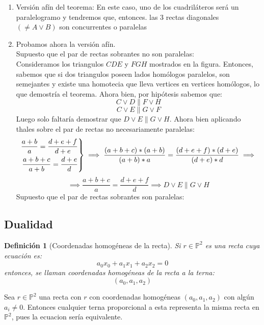 \documentclass[11pt, a4paper]{article}
\makeatletter
\newif\IfInSansMode
\let\oldsf\sffamily
\renewcommand*{\sffamily}{\oldsf\mathversion{sans}\InSansModetrue}
\let\oldnorm\normalfont
\renewcommand*{\normalfont}{\oldnorm\InSansModefalse\mathversion{normal}}
\renewenvironment{proof}[1][\proofname] {\vspace{-15pt}\par\pushQED{\qed}\normalfont\topsep6\p@\@plus6\p@\relax\trivlist\item[\hskip\labelsep\it#1\@addpunct{.}]\ignorespaces}{\popQED\endtrivlist\@endpefalse}
\renewenvironment{proof}[1][\proofname] {\par\pushQED{\qed}\normalfont\topsep6\p@\@plus6\p@\relax\trivlist\item[\hskip\labelsep\itshape\sffamily#1\@addpunct{.}]\ignorespaces}{\popQED\endtrivlist\@endpefalse}
\theoremstyle{theorem-style}
\theoremstyle{definition-style}
\newtheorem{ndef}{Definición}[section]
\theoremstyle{remark-style}
\theoremstyle{example-style}
\newenvironment{nlist}
{\begin{enumerate}
    \renewcommand\labelenumi{(\emph{\roman{enumi})}}}
  {\end{enumerate}}
\newenvironment{rcases}
{\left.\begin{aligned}}
    {\end{aligned}\right\rbrace}
\makeatother
\begin{document}
\begin{proof} \hfill
	\begin{nlist}
	\item Versión afín del teorema: En este caso, uno de los cuadriláteros será un paralelogramo y tendremos que, entonces. las 3 rectas diagonales $(\ne A\vee B)$ son concurrentes o paralelas
	\item Probamos ahora la versión afín.\\
	Supuesto que el par de rectas sobrantes no son paralelas:\\
	Consideramos los triangulos $CDE$ y $FGH$ mostrados en la figura. Entonces, sabemos que si dos triangulos poseen lados homólogos paralelos, son semejantes y existe una homotecia que lleva vertices en vertices homólogos, lo que demostría el teorema.
	Ahora bien, por hipótesis sabemos que:
	$$C \vee D \parallel F \vee H$$
	$$C \vee E \parallel G \vee F$$
	Luego solo faltaría demostrar que $D \vee E \parallel G \vee H$. Ahora bien aplicando thales sobre el par de rectas no necesariamente paralelas:
	\[
	\begin{rcases}
		\frac{a+b}{a} = \frac{d+e+f}{d+e}\\
		\frac{a+b+c}{a+b} = \frac{d+e}{d}	
\end{rcases} \implies \frac{(a+b+c)*(a+b)}{(a+b)*a} = \frac{(d+e+f)*(d+e)}{(d+e)*d} \implies  
\]
$$\implies \frac{a+b+c}{a} = \frac{d+e+f}{d} \implies D \vee E \parallel G \vee H$$
Supuesto que el par de rectas sobrantes son paralelas:
\end{nlist}
\end{proof}

\subsection{Dualidad}

\begin{ndef}[Coordenadas homogéneas de la recta]
	Si $r \in \mathbb P ^2$ es una recta cuya ecuación es:
	\[
	a_0x_0 + a_1x_1 + a_2 x_2 = 0
	\]
	entonces, se llaman coordenadas homogéneas de la recta a la terna:
	\[
	(a_0,a_1,a_2)
	\]
\end{ndef}
 
Sea $r \in \mathbb P ^2$ una recta con $r$ con coordenadas homogéneas $(a_0,a_1,a_2)$  con algún $a_i \ne 0$. Entonces cualquier terna proporcional a esta representa la misma recta en $\mathbb{P}^2$, pues la ecuacion sería equivalente.
\end{document}
